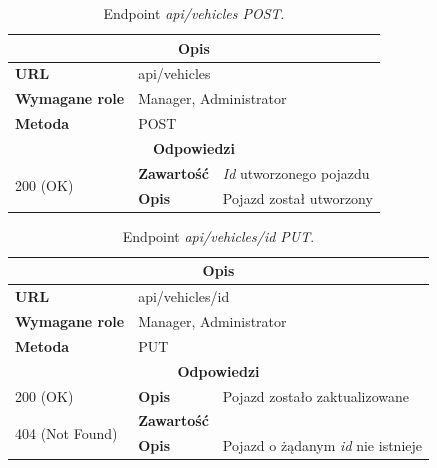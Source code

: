 \documentclass[eng,printmode,openany]{mgr}
\begin{document}
\begin{table}[H]
	\caption{Endpoint \textit{api/vehicles POST}.}
	\begin{tabularx}{\textwidth}{|l|l|X|}
		\hline
		\multicolumn{3}{|c|}{\textbf{\textbf{Opis}}}
		\\ \hline
		\textbf{URL}                       & \multicolumn{2}{l|}{api/vehicles}
		\\ \hline
		\textbf{Wymagane role}             & \multicolumn{2}{l|}{Manager, Administrator}
		\\ \hline
		\textbf{Metoda}                    & \multicolumn{2}{l|}{POST}
		\\ \hline
		\multicolumn{3}{|c|}{\textbf{Odpowiedzi}}
		\\ \hline
		\multirow{2}{*}{200 (OK)} 		& \textbf{Zawartość}     & \textit{Id} utworzonego pojazdu
		\\ \cline{2-3}                  & \textbf{Opis}         	& Pojazd został utworzony
		\\ \hline
	\end{tabularx}
\end{table}

\begin{table}[H]
	\caption{Endpoint \textit{api/vehicles/id PUT}.}
	\begin{tabularx}{\textwidth}{|l|l|X|}
		\hline
		\multicolumn{3}{|c|}{\textbf{\textbf{Opis}}}
		\\ \hline
		\textbf{URL}                       & \multicolumn{2}{l|}{api/vehicles/id}
		\\ \hline
		\textbf{Wymagane role}             & \multicolumn{2}{l|}{Manager, Administrator}
		\\ \hline
		\textbf{Metoda}                    & \multicolumn{2}{l|}{PUT}
		\\ \hline
		\multicolumn{3}{|c|}{\textbf{Odpowiedzi}}
		\\ \hline
		200 (OK) 		                        & \textbf{Opis}      	& Pojazd zostało zaktualizowane
		\\ \hline
		\multirow{2}{*}{404 (Not Found)} 	    & \textbf{Zawartość}     &   
		\\ \cline{2-3}                          & \textbf{Opis}          & Pojazd o żądanym \textit{id} nie istnieje
		\\ \hline
	\end{tabularx}
\end{table}
\end{document}
